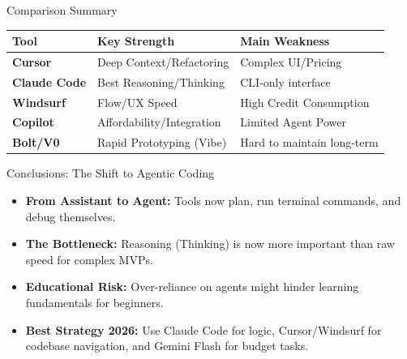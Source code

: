 \documentclass[aspectratio=169]{beamer}
\begin{document}
\begin{frame}[t]{Comparison Summary}
    \begin{table}
        \footnotesize
        \centering
        \begin{tabularx}{\textwidth}{l X X}
        \toprule
        \textbf{Tool} & \textbf{Key Strength} & \textbf{Main Weakness} \\ 
        \midrule
        \textbf{Cursor} & Deep Context/Refactoring & Complex UI/Pricing \\ 
        \addlinespace
        \textbf{Claude Code} & Best Reasoning/Thinking & CLI-only interface \\ 
        \addlinespace
        \textbf{Windsurf} & Flow/UX Speed & High Credit Consumption \\ 
        \addlinespace
        \textbf{Copilot} & Affordability/Integration & Limited Agent Power \\ 
        \addlinespace
        \textbf{Bolt/V0} & Rapid Prototyping (Vibe) & Hard to maintain long-term \\ 
        \bottomrule
        \end{tabularx}
    \end{table}
\end{frame}

\begin{frame}[t]{Conclusions: The Shift to Agentic Coding}
    \begin{itemize}
        \item \textbf{From Assistant to Agent:} Tools now plan, run terminal commands, and debug themselves.
        \item \textbf{The Bottleneck:} Reasoning (Thinking) is now more important than raw speed for complex MVPs.
        \item \textbf{Educational Risk:} Over-reliance on agents might hinder learning fundamentals for beginners.
        \item \textbf{Best Strategy 2026:} Use Claude Code for logic, Cursor/Windsurf for codebase navigation, and Gemini Flash for budget tasks.
    \end{itemize}
\end{frame}
\end{document}
